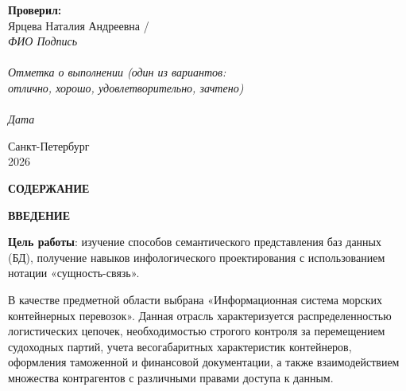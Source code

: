 \documentclass[a4paper,14pt]{article}
\begin{document}
\begin{titlepage}
\begin{flushright}
        \textbf{Проверил:}\\ [0.5em]
        Ярцева Наталия Андреевна / \underline{\hspace{1.5cm}} \\
        {\scriptsize{\textit{ФИО \hspace{2cm} Подпись \hspace{1cm}}}} \\ [1.5cm]

        {\scriptsize \underline{\hspace{4cm}}} \\
        {\scriptsize \textit{Отметка о выполнении (один из вариантов: \\ отлично, хорошо, удовлетворительно, зачтено)}} \\
        {\scriptsize \underline{\hspace{4cm}}} \\
        {\scriptsize \textit{Дата \hspace{1.5cm}}}
    \end{flushright}

    \vfill
    Санкт-Петербург\\
    2026
\end{titlepage}

\newpage
\pagestyle{plain}
\setcounter{page}{2}

\begin{center}
    {\bfseries \MakeUppercase{Содержание}}
\end{center}
\vspace{-0.5cm}
\tableofcontents

\newpage
\begin{center}
    {\bfseries \MakeUppercase{Введение}}
\end{center}

\textbf{Цель работы}: изучение способов семантического представления баз данных (БД), получение навыков инфологического проектирования с использованием нотации «сущность-связь».

В качестве предметной области выбрана «Информационная система морских контейнерных перевозок». Данная отрасль характеризуется распределенностью логистических цепочек, необходимостью строгого контроля за перемещением судоходных партий, учета весогабаритных характеристик контейнеров, оформления таможенной и финансовой документации, а также взаимодействием множества контрагентов с различными правами доступа к данным.
\end{document}
